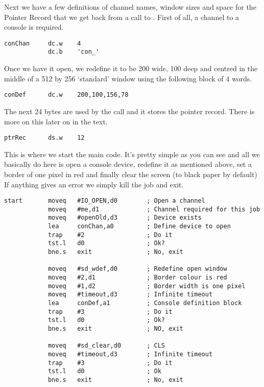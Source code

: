 Next we have a few definitions of channel names, window sizes and space for the
Pointer Record that we get back from a call to . First of all, a channel to a
console is required.

\begin{lstlisting}[firstnumber=last,caption={Simple PE Program - Part 3}]
conChan     dc.w    4
            dc.b    'con_'
\end{lstlisting}

Once we have it open, we redefine it to be 200 wide, 100 deep and centred in the
middle of a 512 by 256 `standard' window using the following block of 4 words.

\begin{lstlisting}[firstnumber=last,caption={Simple PE Program - Part 4}]
conDef      dc.w    200,100,156,78
\end{lstlisting}

The next 24 bytes are used by the  call and it stores the pointer record.
There is more on this later on in the text.

\begin{lstlisting}[firstnumber=last,caption={Simple PE Program - Part 5}]
ptrRec      ds.w    12
\end{lstlisting}

This is where we start the main code. It's pretty simple as you can see and all we
basically do here is open a console device, redefine it as mentioned above, set a border
of one pixel in red and finally clear the screen (to black paper by default)  If anything
gives an error we simply kill the job and exit.

\begin{lstlisting}[firstnumber=last,caption={Simple PE Program - Part 6}]
start       moveq   #IO_OPEN,d0        ; Open a channel
            moveq   #me,d1             ; Channel required for this job
            moveq   #openOld,d3        ; Device exists
            lea     conChan,a0         ; Define device to open
            trap    #2                 ; Do it
            tst.l   d0                 ; Ok?
            bne.s   exit               ; No, exit

            moveq   #sd_wdef,d0        ; Redefine open window
            moveq   #2,d1              ; Border colour is red
            moveq   #1,d2              ; Border width is one pixel
            moveq   #timeout,d3        ; Infinite timeout
            lea     conDef,a1          ; Console definition block
            trap    #3                 ; Do it
            tst.l   d0                 ; Ok?
            bne.s   exit               ; NO, exit

            moveq   #sd_clear,d0       ; CLS
            moveq   #timeout,d3        ; Infinite timeout
            trap    #3                 ; Do it
            tst.l   d0                 ; Ok
            bne.s   exit               ; No, exit
\end{lstlisting}

